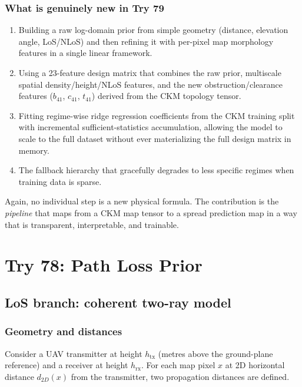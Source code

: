 \documentclass[11pt,a4paper]{article}
\begin{document}
\subsubsection{What is genuinely new in Try 79}

\begin{enumerate}
\item Building a raw log-domain prior from simple geometry (distance, elevation
      angle, LoS/NLoS) and then refining it with per-pixel map morphology
      features in a single linear framework.
\item Using a 23-feature design matrix that combines the raw prior, multiscale
      spatial density/height/NLoS features, and the new obstruction/clearance
      features ($b_{41}$, $c_{41}$, $t_{41}$) derived from the CKM topology
      tensor.
\item Fitting regime-wise ridge regression coefficients from the CKM training
      split with incremental sufficient-statistics accumulation, allowing the
      model to scale to the full dataset without ever materializing the full
      design matrix in memory.
\item The fallback hierarchy that gracefully degrades to less specific regimes
      when training data is sparse.
\end{enumerate}

Again, no individual step is a new physical formula. The contribution is the
\emph{pipeline} that maps from a CKM map tensor to a spread prediction map
in a way that is transparent, interpretable, and trainable.

\section{Try 78: Path Loss Prior}

\subsection{LoS branch: coherent two-ray model}

\subsubsection{Geometry and distances}

Consider a UAV transmitter at height $h_{\mathrm{tx}}$ (metres above the
ground-plane reference) and a receiver at height $h_{\mathrm{rx}}$. For each
map pixel $x$ at 2D horizontal distance $d_{2D}(x)$ from the transmitter, two
propagation distances are defined.
\end{document}
